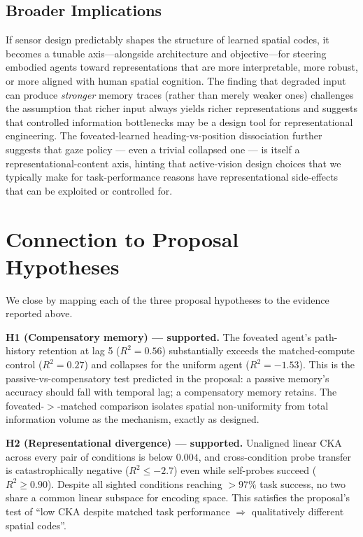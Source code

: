 \documentclass[10pt,conference,compsocconf]{IEEEtran}
\begin{document}
\subsection{Broader Implications}

If sensor design predictably shapes the structure of learned spatial codes, it becomes a tunable axis---alongside architecture and objective---for steering embodied agents toward representations that are more interpretable, more robust, or more aligned with human spatial cognition. The finding that degraded input can produce \emph{stronger} memory traces (rather than merely weaker ones) challenges the assumption that richer input always yields richer representations and suggests that controlled information bottlenecks may be a design tool for representational engineering. The foveated-learned heading-vs-position dissociation further suggests that gaze policy --- even a trivial collapsed one --- is itself a representational-content axis, hinting that active-vision design choices that we typically make for task-performance reasons have representational side-effects that can be exploited or controlled for.

\section{Connection to Proposal Hypotheses}

We close by mapping each of the three proposal hypotheses to the evidence reported above.

\textbf{H1 (Compensatory memory) --- supported.} The foveated agent's path-history retention at lag 5 ($R^2=0.56$) substantially exceeds the matched-compute control ($R^2=0.27$) and collapses for the uniform agent ($R^2=-1.53$). This is the passive-vs-compensatory test predicted in the proposal: a passive memory's accuracy should fall with temporal lag; a compensatory memory retains. The foveated-$>$-matched comparison isolates spatial non-uniformity from total information volume as the mechanism, exactly as designed.

\textbf{H2 (Representational divergence) --- supported.} Unaligned linear CKA across every pair of conditions is below $0.004$, and cross-condition probe transfer is catastrophically negative ($R^2 \leq -2.7$) even while self-probes succeed ($R^2 \geq 0.90$). Despite all sighted conditions reaching $>97\%$ task success, no two share a common linear subspace for encoding space. This satisfies the proposal's test of ``low CKA despite matched task performance $\Rightarrow$ qualitatively different spatial codes''.
\end{document}
